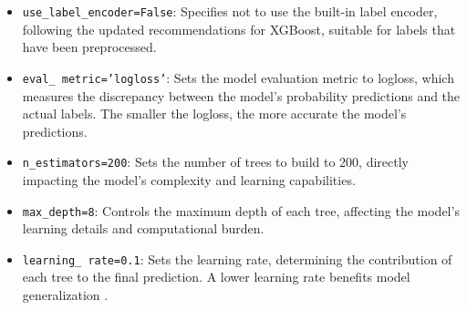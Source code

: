 \documentclass[12pt]{article}
\begin{document}
\begin{itemize}
    \item \texttt{use\_label\_encoder=False}: Specifies not to use the built-in label encoder, following the updated recommendations for XGBoost, suitable for labels that have been preprocessed.
    \item \texttt{eval\_\,metric='logloss'}: Sets the model evaluation metric to logloss, which measures the discrepancy between the model's probability predictions and the actual labels. The smaller the logloss, the more accurate the model's predictions.
    \item \texttt{n\_estimators=200}: Sets the number of trees to build to 200, directly impacting the model's complexity and learning capabilities.
    \item \texttt{max\_depth=8}: Controls the maximum depth of each tree, affecting the model's learning details and computational burden.
    \item \texttt{learning\_{\,rate}=0.1}: Sets the learning rate, determining the contribution of each tree to the final prediction. A lower learning rate benefits model generalization .
\end{itemize}
\end{document}
